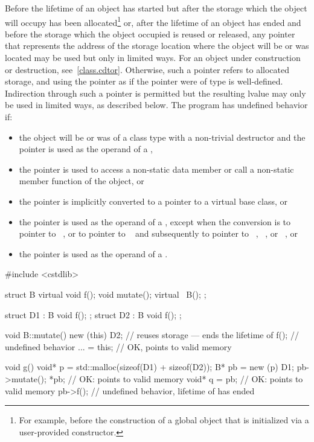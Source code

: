 \pnum
Before the lifetime of an object has started but after the storage which
the object will occupy has been allocated\footnote{For example, before the
construction of a global object
that is initialized via a user-provided constructor.}
or, after the lifetime of an object has ended and before the storage
which the object occupied is reused or released, any pointer that represents the address of
the storage location where the object will be or was located may be
used but only in limited ways.
For an object under construction or destruction, see~\ref{class.cdtor}.
Otherwise, such
a pointer refers to allocated
storage, and using the pointer as
if the pointer were of type  is
well-defined. Indirection through such a pointer is permitted but the resulting lvalue may only be used in
limited ways, as described below. The
program has undefined behavior if:
\begin{itemize}
\item
  the object will be or was of a class type with a non-trivial destructor
  and the pointer is used as the operand of a ,
\item
  the pointer is used to access a non-static data member or call a
  non-static member function of the object, or
\item
  the pointer is implicitly converted to a pointer
  to a virtual base class, or
\item
  the pointer is used as the operand of a
  , except when the conversion
  is to pointer to \cv{}~, or to pointer to \cv{}~
  and subsequently to pointer to
  \cv{}~,
  \cv{}~, or
  \cv{}~, or
\item
  the pointer is used as the operand of a
  .
\end{itemize}
\begin{example}
\begin{codeblock}
#include <cstdlib>

struct B {
  virtual void f();
  void mutate();
  virtual ~B();
};

struct D1 : B { void f(); };
struct D2 : B { void f(); };

void B::mutate() {
  new (this) D2;    // reuses storage --- ends the lifetime of 
  f();              // undefined behavior
  ... = this;       // OK,  points to valid memory
}

void g() {
  void* p = std::malloc(sizeof(D1) + sizeof(D2));
  B* pb = new (p) D1;
  pb->mutate();
  *pb;              // OK:  points to valid memory
  void* q = pb;     // OK:  points to valid memory
  pb->f();          // undefined behavior, lifetime of  has ended
}
\end{codeblock}
\end{example}

